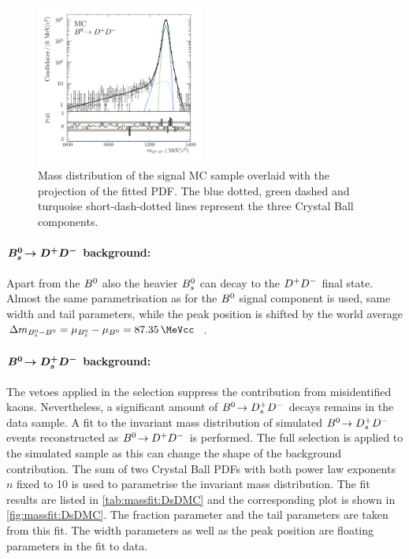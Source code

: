 \begin{figure}[tbh]
\centering
\includegraphics[width=0.49\textwidth]{07-B02DD/tikz/pdf/obsMass_MC.pdf}
\caption{Mass distribution of the \BdToDD signal MC sample overlaid with the
projection of the fitted PDF. The blue dotted, green dashed and turquoise
short-dash-dotted lines represent the three Crystal Ball components.}%
\label{fig:b02dd:massfit:mc}
\end{figure}

\paragraph{$\boldsymbol{{{B}^0_{s}}\!\rightarrow {\ensuremath{{D}^+}}{\ensuremath{{D}^-}}}$ background:}
Apart from the ${{B}^0}$ also the heavier ${{B}^0_{s}}$ can decay to the ${{D}^+}{{D}^-}$ final state.
Almost the same parametrisation as for the ${{B}^0}$ signal component is used, \ie
same width and tail parameters, while the peak position is shifted by the
world average $\dmBdBs = \mu_{\Bs} - \mu_{\Bd} =
\SI{87.35}{\MeVcc}$~\cite{PDG2016}.

\paragraph{$\boldsymbol{{{B}^0}\!\rightarrow {\ensuremath{{D}^+_{s}}}{\ensuremath{{D}^-}}}$ background:}
The vetoes applied in the selection suppress the contribution from
misidentified kaons. Nevertheless, a significant amount of \mbox{${{B}^0}\!\rightarrow {\ensuremath{{D}^+_{s}}}{\ensuremath{{D}^-}}$}
decays remains in the data sample. A fit to the invariant mass distribution of
simulated ${{B}^0}\!\rightarrow {\ensuremath{{D}^+_{s}}}{\ensuremath{{D}^-}}$ events reconstructed as ${{B}^0}\!\rightarrow {\ensuremath{{D}^+}}{\ensuremath{{D}^-}}$ is performed. The full
selection is applied to the simulated sample as this can change the shape of
the \BdToDsD background contribution. The sum of two Crystal Ball PDFs with
both power law exponents $n$ fixed to \num{10} is used to parametrise the
invariant mass distribution. The fit results are listed in
\cref{tab:massfit:DsDMC} and the corresponding plot is shown in
\cref{fig:massfit:DsDMC}. The fraction parameter and the tail parameters are
taken from this fit. The width parameters as well as the peak position are
floating parameters in the fit to data.

